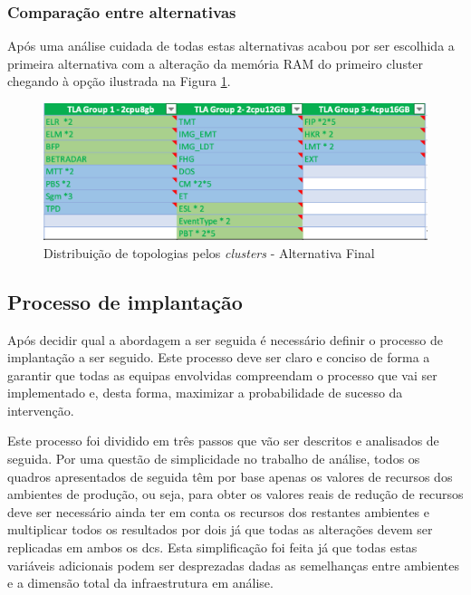 \subsubsection{Comparação entre alternativas}

Após uma análise cuidada de todas estas alternativas acabou por ser escolhida a primeira alternativa
com a alteração da memória RAM do primeiro \gls{cluster} chegando à opção ilustrada na Figura
\ref{proposal-final}.

\begin{figure}[H]
  \centerline{\includegraphics[scale=0.6]{media/content/analise/proposal-final.png}}
  \caption{Distribuição de topologias pelos \textit{clusters} - Alternativa Final}
  \label{proposal-final}
\end{figure}

\subsection{Processo de implantação}

Após decidir qual a abordagem a ser seguida é necessário definir o processo de implantação a ser
seguido. Este processo deve ser claro e conciso de forma a garantir que todas as equipas envolvidas
compreendam o processo que vai ser implementado e, desta forma, maximizar a probabilidade de
sucesso da intervenção. 

Este processo foi dividido em três passos que vão ser descritos e analisados de seguida. Por uma
questão de simplicidade no trabalho de análise, todos os quadros apresentados de seguida têm por 
base apenas os valores de recursos dos ambientes de produção, ou seja, para obter os valores reais
de redução de recursos deve ser necessário ainda ter em conta os recursos dos restantes ambientes
e multiplicar todos os resultados por dois já que todas as alterações devem ser replicadas em 
ambos os \glspl{dc}. Esta simplificação foi feita já que todas estas variáveis adicionais podem 
ser desprezadas dadas as semelhanças entre ambientes e a dimensão total da infraestrutura em
análise.

